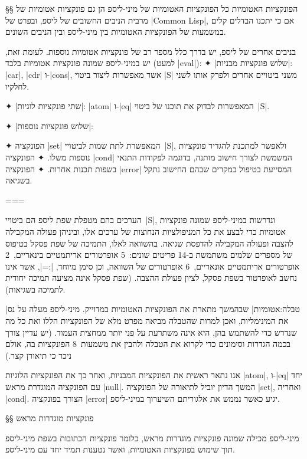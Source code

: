 §§ הפונקציות האטומיות
כל הפונקציות האטומיות של מיני-ליספ הן גם פונקציות אטומיות של מרבית הניבים
החשובים של ליספ, ובפרט של \E|Common Lisp|, אם כי יתכנו הבדלים קלים במשמעות של
הפונקציות האטומיות בין מיני-ליספ ובין הניבים השונים.

בניבים אחרים של ליספ, יש בדרך כלל מספר רב של פונקציות אטומיות נוספות. לעומת
זאת, יש במיני-ליספ שמונה פונקציות אטומיות בלבד (למעט \E|eval|):
✦ \ע|שלוש פונקציות מבניות|: \E|car|, \E|cdr| ו-\E|cons|, אשר מאפשרות ליצור ביטוי
\E|S| משני ביטויים אחרים ולפרק אותו לשני לחלקיו.

✦ \ע|שתי פונקציות לוגיות|: \E|atom| ו-\E|eq| המאפשרות לבדוק את תוכנו של
ביטוי~\E|S|.

✦ \ע|שלוש פונקציות נוספות|:
\begin{itemize}
    ✦ הפונקציה \E|set| המאפשרת לתת שמות לביטויי~\E|S|, ולאפשר למתכנת להגדיר
      פונקציות נוספות משלו.
      ✦ הפונקציה \E|cond| המשמשת לצורך חישוב מותנה, בדוגמה לפקודות התנאי בשפות תכנות אחרות.
      ✦ הפונקציה \E|error| המסייעת בטיפול במקרים שבהם החישוב נתקל בשגיאה.
\end{itemize}
===

הערכים בהם מטפלת שפת ליספ הם ביטויי~\E|S|, ונדרשות במיני-ליספ שמונה פונקציות
אטומיות כדי לבצע את כל המניפולציות הנחוצות של ערכים אלו, וביניהן פעולה המקבילה
להצבה ופעולה המקבילה להדפסת שגיאה. בהשוואה לאלו, התמיכה של שפת פסקל בטיפוס של
מספרים שלמים משתמשת ב-14 פריטים שונים:~5 אופרטורים אריתמטיים בינאריים,~2
אופרטורים אריתמטיים אונאריים,~6 אופרטורים של השוואה, וכן סימן מיוחד, \E|:=|,
אשר אינו נחשב לאופרטור בשפת פסקל, לציון פעולת ההצבה. (שפת פסקל אינה מציעה תמיכה
יחודית לתמיכה בשגיאות).

|טבלה:אטומיות| שבהמשך מתארת את הפונקציות האטומיות במדוייק. מיני-ליספ מעלה
על נס את המינימליות, ואכן למרות שהטבלה מביאה מפרט מלא של הפונקציות הללו ואת כל
מה שנדרש כדי להשתמש בהן, היא אינה משתרעת על פני יותר ממחצית העמוד. (יש עדיין
צורך בכמה הגדרות וסימונים כדי לקרוא את הטבלה ולהבין את משמעות~8 הפונקציות בה,
אולם ניכר כי תיאורן קצר.)

אנו נתאר ראשית את הפונקציות המבניות, ואחר כך את הפונקציות הלוגיות \E|atom|,
ו-\E|eq| יחד עם הפונקציה המוגדרת מראש \E|null|. המשך הדיון יוביל לתיאורה של
הפונקציה \E|set|, ואחריה \E|cond|. הצורך בפונקציה \E|error| יגיע כאשר נממש את
אלגוריתם השיערוך במיני-ליספ.

§§ פונקציות מוגדרות מראש

מיני-ליספ מכילה שמונה פונקציות מוגדרות מראש, כלומר פונקציות הכתובות בשפת
מיני-ליספ תוך שימוש בפונקציות האטומיות, ואשר נטענות תמיד יחד עם מיני-ליספ.

